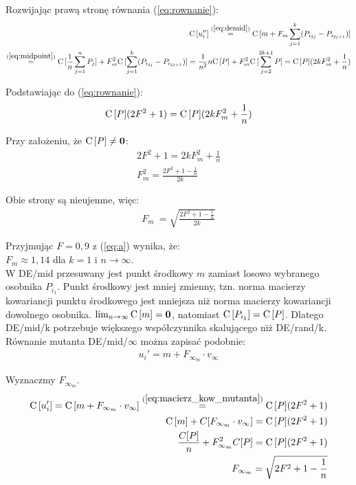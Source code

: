 \documentclass[a4paper,onecolumn,oneside,11pt,wide,floatssmall]{mwrep}
\def\C{{\rm C}\,}
\theoremstyle{definition}
\theoremstyle{plain}%
\theoremstyle{remark}
\begin{document}
Rozwijając prawą stronę równania (\ref{eq:rownanie}):
\begin{align*}
\C[u_i''] \overset{(\ref{eq:demid})}{=} \C[m + F_m\sum\limits_{j=1}^k (P_{i_{2j}} - P_{i_{2j+1}})] \\
\overset{(\ref{eq:midpoint})}{=} \C[\frac{1}{n}\sum\limits_{j=1}^n P_j] + F_m^2\C[\sum\limits_{j=1}^k (P_{i_{2j}} - P_{i_{2j+1}})] 
= \frac{1}{n^2}n\C[P] + F_m^2\C[\sum\limits_{j=2}^{2k+1} P] = \C[P](2kF_m^2 + \frac{1}{n})
\end{align*}

Podstawiając do (\ref{eq:rownanie}):
\begin{align*}
\C[P](2F^2 + 1) = \C[P](2kF_m^2 + \frac{1}{n})
\end{align*}

Przy założeniu, że $\C[P] \neq \textbf{0}$:
\begin{align*}
2F^2 + 1 = 2kF_m^2 + \frac{1}{n} \\
F_m^2 = \frac{2F^2 + 1 - \frac{1}{n}}{2k}
\end{align*}

Obie strony są nieujemne, więc:
\begin{align} \label{eq:a}
F_m\ = \sqrt{\frac{2F^2 + 1 - \frac{1}{n}}{2k}}
\end{align}

Przyjmując $F=0,9$ z (\ref{eq:a}) wynika, że: \\
$F_m \approx 1,14$ dla $k=1$ i $n\to\infty$. \\

W DE/mid przesuwany jest punkt środkowy $m$ zamiast losowo wybranego osobnika $P_{i_1}$.
Punkt środkowy jest mniej zmienny, 
tzn. norma macierzy kowariancji punktu środkowego jest mniejsza niż norma macierzy kowariancji dowolnego osobnika.
$\lim_{n\to\infty} \C[m] = \textbf{0}$, natomiast $\C[P_{i_1}] = \C[P]$.
Dlatego DE/mid/k potrzebuje większego współczynnika skalującego niż DE/rand/k. \\

Równanie mutanta DE/mid/$\infty$ można zapisać podobnie:
\begin{align*}
u_i' = m + F_{\infty_m} \cdot v_\infty
\end{align*}

Wyznaczmy $F_{\infty_m}$.
\begin{align*}
\C[u_i'] = \C[m + F_{\infty_m} \cdot v_\infty] \overset{(\ref{eq:macierz_kow_mutanta})}{=} \C[P](2F^2 + 1) \\
\C[m] + C[F_{\infty_m} \cdot v_\infty] = \C[P](2F^2 + 1) \\
\frac{C[P]}{n} + F_{\infty_m}^2 C[P] = \C[P](2F^2 + 1) \\
F_{\infty_m} = \sqrt{2F^2 + 1 - \frac{1}{n}}
\end{align*}
\end{document}
